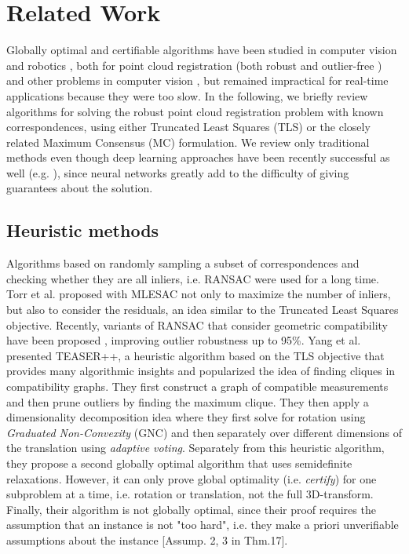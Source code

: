 \section{Related Work}
\label{sec:related-work}

Globally optimal and certifiable algorithms have been studied in computer vision \cite{10.1007/978-3-030-58539-6_18, 10023976, Convex-Relaxations-for-Pose-Graph-Optimization-With-Outliers} and robotics \cite{7759681}, both for point cloud registration (both robust and outlier-free \cite{8100078, GARCIASALGUERO2023103862}) and other problems in computer vision \cite{10378410}, but remained impractical for real-time applications because they were too slow. In the following, we briefly review algorithms for solving the robust point cloud registration problem with known correspondences, using either Truncated Least Squares (TLS) or the closely related Maximum Consensus (MC) formulation. We review only traditional methods even though deep learning approaches have been recently successful as well (e.g. \cite{9157005, bai2021pointdsc}), since neural networks greatly add to the difficulty of giving guarantees about the solution.

\subsection{Heuristic methods}
Algorithms based on randomly sampling a subset of correspondences and checking whether they are all inliers, i.e. RANSAC were used for a long time. Torr et al. \cite{TORR2000138} proposed with MLESAC not only to maximize the number of inliers, but also to consider the residuals, an idea similar to the Truncated Least Squares objective. Recently, variants of RANSAC that consider geometric compatibility have been proposed \cite{9052691, 9552513}, improving outlier robustness up to 95\%.
Yang et al. \cite{Yang2020OneRT} presented TEASER++, a heuristic algorithm based on the TLS objective that provides many algorithmic insights and popularized the idea of finding cliques in compatibility graphs. They first construct a graph of compatible measurements and then prune outliers by finding the maximum clique. They then apply a dimensionality decomposition idea where they first solve for rotation using \textit{Graduated Non-Convexity} (GNC) and then separately over different dimensions of the translation using \textit{adaptive voting}. Separately from this heuristic algorithm, they propose a second globally optimal algorithm that uses semidefinite relaxations. However, it can only prove global optimality (i.e. \textit{certify}) for one subproblem at a time, i.e. rotation or translation, not the full 3D-transform. Finally, their algorithm is not globally optimal, since their proof requires the assumption that an instance is not "too hard", i.e. they make a priori unverifiable assumptions about the instance [Assump. 2, 3 in Thm.17]\cite{Yang20tro-teaser}. 

